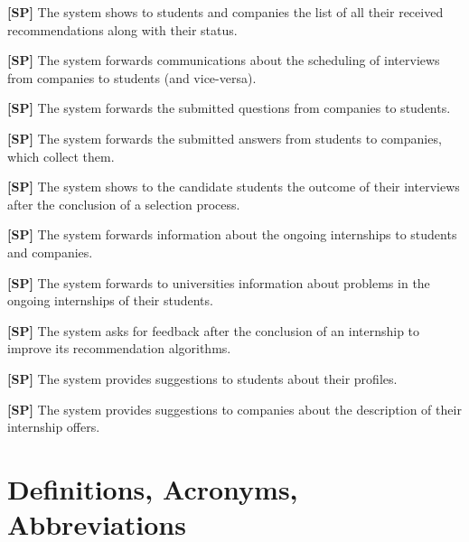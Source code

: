         \textbf{[SP\csp]} The system shows to students and companies the list of all their received recommendations along with their status.

        \textbf{[SP\csp]} The system forwards communications about the scheduling of interviews from companies to students (and vice-versa).
        
        \textbf{[SP\csp]} The system forwards the submitted questions from companies to students.
        
        \textbf{[SP\csp]} The system forwards the submitted answers from students to companies, which collect them.

        \textbf{[SP\csp]} The system shows to the candidate students the outcome of their interviews after the conclusion of a selection process.

        \textbf{[SP\csp]} The system forwards information about the ongoing internships to students and companies.

        \textbf{[SP\csp]} The system forwards to universities information about problems in the ongoing internships of their students.

        \textbf{[SP\csp]} The system asks for feedback after the conclusion of an internship to improve its recommendation algorithms.        

        \textbf{[SP\csp]} The system provides suggestions to students about their profiles.

        \textbf{[SP\csp]} The system provides suggestions to companies about the description of their internship offers.

\section{Definitions, Acronyms, Abbreviations}
\label{sec:definition_acronyms_abbreviations}

